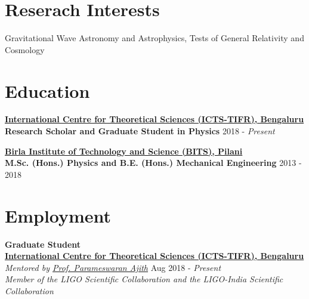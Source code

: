 \documentclass[margin, centered]{res}
\begin{document}
\begin{resume}

\section{Reserach Interests}
Gravitational Wave Astronomy and Astrophysics, Tests of General Relativity and Cosmology 
\\
\section{Education}
\textbf{\href{https://www.icts.res.in/}{International Centre for Theoretical Sciences (ICTS-TIFR), Bengaluru}}\\
\textbf{Research Scholar and Graduate Student in Physics} \hfill 2018 - \textit{Present}

\textbf{\href{http://www.bits-pilani.ac.in/}{Birla Institute of Technology and Science (BITS), Pilani}}\\
\textbf{M.Sc. (Hons.) Physics and B.E. (Hons.) Mechanical Engineering} \hfill 2013 - 2018


\section{Employment}
\textbf{Graduate Student}
\\
\textbf{\href{https://www.icts.res.in/}{International Centre for Theoretical Sciences (ICTS-TIFR), Bengaluru}}\\
\emph{Mentored by \href{https://home.icts.res.in/~ajith/Home.html}{Prof. Parameswaran Ajith}} \hfill Aug 2018 - \textit{Present}\\
\textit{Member of the LIGO Scientific Collaboration and the LIGO-India Scientific Collaboration}


\end{resume}
\end{document}
